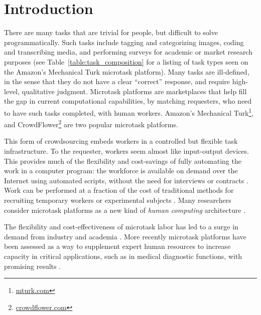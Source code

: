 \documentclass{sigchi}
\begin{document}


\section{Introduction}
There are many tasks that are trivial for people, but difficult to solve
programmatically.  
Such tasks include tagging and categorizing images,
coding and transcribing media,
and performing surveys for 
academic or market research purposes (see Table~\ref{table:task_composition} for a listing of task types seen on the Amazon's Mechanical Turk 
microtask platform).
Many tasks are ill-defined, in the sense that they do not have
a clear ``correct'' response, and require high-level, qualitative judgment.
Microtask platforms are marketplaces that help fill the gap in current 
computational capabilities, by matching requesters, who need to have such 
tasks completed, with human workers.  Amazon's Mechanical Turk\footnote{\url{mturk.com}}, and 
CrowdFlower\footnote{\url{crowdflower.com}} are two popular microtask 
platforms.  

This form of crowdsourcing embeds workers in a controlled but flexible
task infrastructure.  
To the requester, workers seem almost like input-output devices.  
This provides much of the flexibility and 
cost-savings of fully automating the work in a computer program: 
the workforce is available on demand over the Internet using automated 
scripts, without the need for interviews or contracts 
\cite{wolfson2011look,5543192}.
Work can be performed at a fraction of the cost of traditional methods for 
recruiting temporary workers or experimental subjects
\cite{Berinsky2012351}. %
Many researchers consider microtask platforms 
as a new kind of \textit{human computing} architecture
\cite{5543192}. %

The flexibility and cost-effectiveness of microtask labor
has led to a surge in demand from industry and 
academia \cite{wolfson2011look,Berinsky2012351}.  More recently microtask 
platforms have
been assessed as a way to supplement expert human resources to increase
capacity in critical applications, such as in medical diagnostic functions,
with promising results \cite{Warby2014385}.
\end{document}
